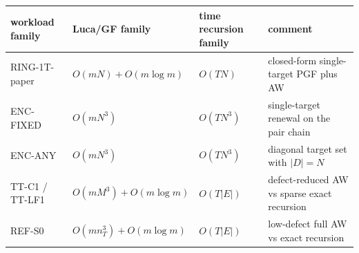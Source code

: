 \begin{tabular}{llll}
\toprule
workload family & Luca/GF family & time recursion family & comment \\
\midrule
RING-1T-paper & $O(mN)+O(m\log m)$ & $O(TN)$ & closed-form single-target PGF plus AW \\
ENC-FIXED & $O(mN^3)$ & $O(TN^3)$ & single-target renewal on the pair chain \\
ENC-ANY & $O(mN^3)$ & $O(TN^3)$ & diagonal target set with $|D|=N$ \\
TT-C1 / TT-LF1 & $O(mM^3)+O(m\log m)$ & $O(T|E|)$ & defect-reduced AW vs sparse exact recursion \\
REF-S0 & $O(mn_T^3)+O(m\log m)$ & $O(T|E|)$ & low-defect full AW vs exact recursion \\
\bottomrule
\end{tabular}
